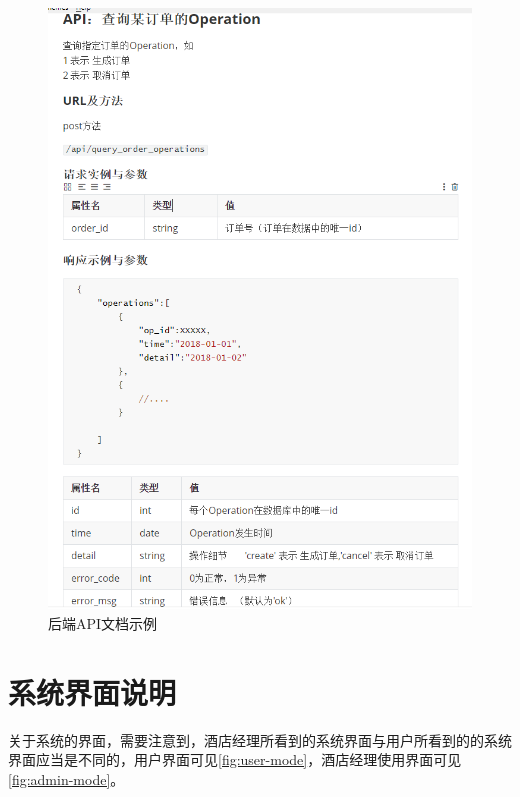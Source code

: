 \documentclass{myreport}
\begin{document}
\begin{figure}[htp]
    \centering
    \includegraphics[width=13cm]{figure/2018-12-22-12-14-27.png}
    \caption{后端API文档示例}
    \label{fig:api-document-example}
\end{figure}


\section{系统界面说明}

关于系统的界面，需要注意到，酒店经理所看到的系统界面与用户所看到的的系统界面应当是不同的，用户界面可见\autoref{fig:user-mode}，酒店经理使用界面可见\autoref{fig:admin-mode}。
\end{document}
